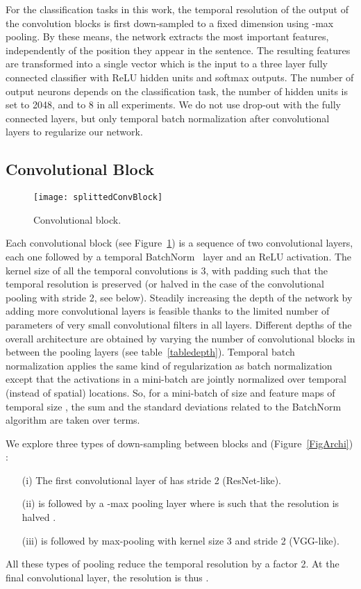 \documentclass[a4paper,11pt]{article}
\begin{document}
For the classification tasks in this work, the temporal resolution
of the output of the convolution blocks is first down-sampled to a fixed
dimension using -max pooling. By these means, the network extracts the 
most important features, independently of the position they appear in the
sentence.  The  resulting features are transformed into a single
vector which is the input to a three layer fully connected classifier with ReLU
hidden units and softmax outputs. The number of output neurons depends on the
classification task, the number of hidden units is set to 2048, and  to 8 in
all experiments. We do not use drop-out with the fully connected layers, but only temporal batch
normalization after convolutional layers to regularize our network.

\subsection*{Convolutional Block}

\label{subsectConvBlock}

\begin{figure}
  \centering
  \texttt{[image: splittedConvBlock]}
    \caption{Convolutional block.}
      \label{FigBlock}

  \vspace{-5mm}
\end{figure}
Each convolutional block (see Figure~\ref{FigBlock}) is a sequence of two
convolutional layers, each one followed by a temporal
BatchNorm~\cite{Ioffs:2015:icml_batchnorm} layer and an ReLU activation. The
kernel size of all the temporal convolutions is 3, with padding such that
the temporal resolution is preserved (or halved in the case of the convolutional
pooling with stride 2, see below). Steadily increasing the depth of the network
by adding more convolutional layers is feasible thanks to the limited number of
parameters of very small convolutional filters in all layers. Different depths of the overall architecture
are obtained by varying the number of convolutional blocks in between the
pooling layers (see table~\ref{tabledepth}). Temporal batch
normalization applies the same kind of regularization as batch normalization
except that the activations in a mini-batch are jointly normalized over
temporal (instead of spatial) locations. So, for a mini-batch of size  and
feature maps of temporal size , the sum and the standard deviations related
to the BatchNorm algorithm are taken over 
terms.

We explore three types of down-sampling between blocks  and  (Figure~\ref{FigArchi}) : 
\begin{enumerate}
\item[(i)] The first
convolutional layer of  has stride 2 (ResNet-like).
\item[(ii)]  is followed by a -max pooling layer where  is such that
the resolution is halved \cite{Kalchbrenner:2014:convNNMT}.
\item[(iii)]  is followed by max-pooling
with kernel size 3 and stride 2 (VGG-like).
\end{enumerate}
All these types of pooling reduce the temporal
resolution by a factor 2. At the final convolutional layer, the resolution is
thus .
\end{document}
